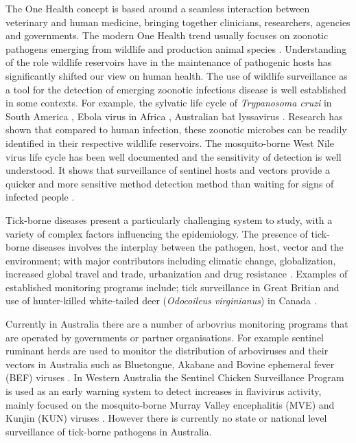 \documentclass[a4paper, nobind]{templates/ociamthesis}
\begin{document}
The One Health concept is based around a seamless interaction between veterinary and human medicine, bringing together clinicians, researchers, agencies and governments.
The modern One Health trend usually focuses on zoonotic pathogens emerging from wildlife and production animal species \autocite{dayOneHealthImportance2011}.
Understanding of the role wildlife reservoirs have in the maintenance of pathogenic hosts has significantly shifted our view on human health.
The use of wildlife surveillance as a tool for the detection of emerging zoonotic infectious disease is well established in some contexts.
For example, the sylvatic life cycle of \emph{Trypanosoma cruzi} in South America \autocite{denoyaEcologicalOverviewFactors2015}, Ebola virus in Africa \autocite{osterholmTransmissionEbolaViruses2015}, Australian bat lyssavirus \autocite{mayIdentificationFocusAreas2020}.
Research has shown that compared to human infection, these zoonotic microbes can be readily identified in their respective wildlife reservoirs.
The mosquito-borne West Nile virus life cycle has been well documented and the sensitivity of detection is well understood.
It shows that surveillance of sentinel hosts and vectors provide a quicker and more sensitive method detection method than waiting for signs of infected people \autocite{lemonGlobalInfectiousDisease2007}.

Tick-borne diseases present a particularly challenging system to study, with a variety of complex factors influencing the epidemiology.
The presence of tick-borne diseases involves the interplay between the pathogen, host, vector and the environment; with major contributors including climatic change, globalization, increased global travel and trade, urbanization and drug resistance \autocite{dantas-torresClimateChangeBiodiversity2015,kulesChallengesAdvancesDiagnosis2017,gilbertImpactsClimateChange2021}.
Examples of established monitoring programs include; tick surveillance in Great Britian \autocite{jamesonTickSurveillanceGreat2011,cullSurveillanceBritishTicks2018} and use of hunter-killed white-tailed deer (\emph{Odocoileus virginianus}) in Canada \autocite{bouchardHarvestedWhitetailedDeer2013}.

Currently in Australia there are a number of arbovrius monitoring programs that are operated by governments or partner organisations.
For example sentinel ruminant herds are used to monitor the distribution of arboviruses and their vectors in Australia such as Bluetongue, Akabane and Bovine ephemeral fever (BEF) viruses \autocite{nationalarbovirusmonitoringprogramNationalArbovirusMonitoring2019}.
In Western Australia the Sentinel Chicken Surveillance Program is used as an early warning system to detect increases in flavivirus activity, mainly focused on the mosquito-borne Murray Valley encephalitis (MVE) and Kunjin (KUN) viruses \autocite{departmentofhealthMedicalEntomologyAnnual2020}.
However there is currently no state or national level surveillance of tick-borne pathogens in Australia.
\end{document}
